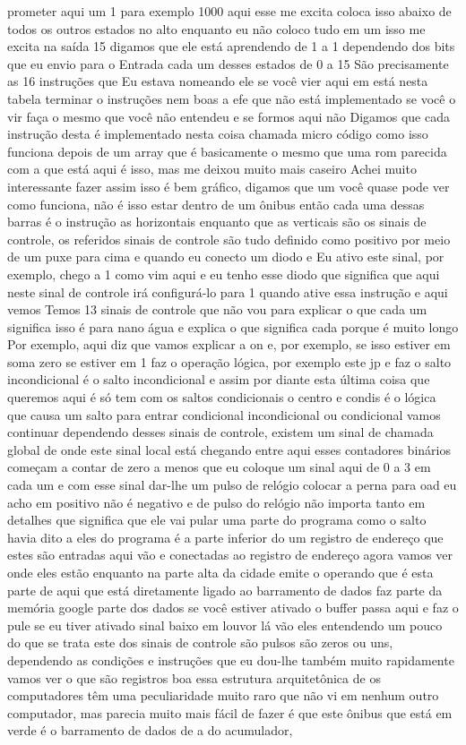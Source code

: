 \documentclass[oneside,11pt]{memoir} %
\begin{document}
prometer aqui um 1 para  exemplo 1000 aqui esse me excita  coloca isso abaixo de todos os outros estados  no alto enquanto eu não coloco tudo  em um isso me excita na saída 15  digamos que ele está aprendendo de 1 a 1  dependendo dos bits que eu envio para o  Entrada  cada um desses estados de 0 a 15  São precisamente as 16 instruções que  Eu estava nomeando ele se você vier aqui em  está nesta tabela terminar o  instruções nem boas a efe que  não está implementado se você o vir  faça o mesmo que você não entendeu  e se formos aqui não  Digamos que cada instrução desta é  implementado nesta coisa chamada micro  código como isso funciona depois de um  array que é basicamente o mesmo que  uma rom parecida com a que está aqui é  isso, mas me deixou muito mais caseiro  Achei muito interessante fazer assim  isso é bem gráfico, digamos que um  você quase pode ver como funciona, não é isso  estar dentro de um ônibus então  cada uma dessas barras é o  instrução as horizontais enquanto  que as verticais são os sinais de  controle, os referidos sinais de controle são  tudo definido como positivo por meio de um  puxe para cima e quando eu conecto um diodo e  Eu ativo este sinal, por exemplo, chego a 1  como vim aqui e eu tenho esse diodo que  significa que aqui neste sinal de  controle irá configurá-lo para 1 quando  ative essa instrução e aqui vemos  Temos 13 sinais de controle que não vou  para explicar o que cada um significa  isso é para nano água e explica o que  significa cada porque é muito longo  Por exemplo, aqui diz que vamos explicar  a on e, por exemplo, se isso estiver em  soma zero se estiver em 1 faz o  operação lógica, por exemplo este  jp e faz o salto incondicional é o  salto incondicional e assim por diante  esta última coisa que queremos aqui é  só tem com os saltos  condicionais o centro e condis é o  lógica que causa um salto para entrar  condicional  incondicional ou condicional vamos continuar  dependendo desses sinais de controle, existem  um sinal de chamada global de onde  este sinal local está chegando  entre aqui  esses contadores binários começam a  contar de zero a menos que eu coloque  um sinal aqui de 0 a 3 em cada  um e com esse sinal dar-lhe um pulso de  relógio colocar a perna para oad eu acho  em positivo não é negativo e de pulso  do relógio não importa tanto em detalhes que  significa que ele vai pular uma parte do  programa como o salto havia dito a eles  do programa é a parte inferior do  um registro de endereço que estes são  entradas aqui vão e conectadas ao  registro de endereço agora vamos ver  onde eles estão enquanto na parte alta da cidade  emite o operando que é esta parte de  aqui que está diretamente ligado ao  barramento de dados faz parte da memória  google parte dos dados se você estiver  ativado o buffer passa aqui e faz o  pule se eu tiver ativado  sinal baixo em louvor lá vão eles  entendendo um pouco do que se trata  este dos sinais de controle são  pulsos são zeros ou uns, dependendo  as condições e instruções que eu  dou-lhe  também muito rapidamente vamos ver  o que são registros  boa essa estrutura arquitetônica de  os computadores têm uma peculiaridade  muito raro que não vi em nenhum outro  computador, mas parecia muito mais  fácil de fazer é que este ônibus  que está em verde é o barramento de dados de  a do acumulador, 
\end{document}

